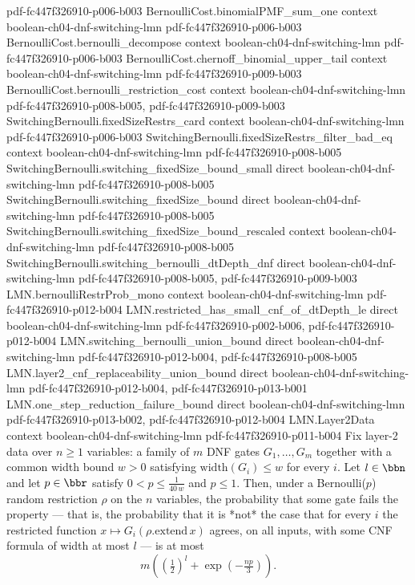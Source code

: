 \begin{theorem}
  {pdf-fc447f326910-p006-b003}
\proofstep
  {BernoulliCost.binomialPMF_sum_one}
  {context}
  {boolean-ch04-dnf-switching-lmn}
  {pdf-fc447f326910-p006-b003}
\proofstep
  {BernoulliCost.bernoulli_decompose}
  {context}
  {boolean-ch04-dnf-switching-lmn}
  {pdf-fc447f326910-p006-b003}
\proofstep
  {BernoulliCost.chernoff_binomial_upper_tail}
  {context}
  {boolean-ch04-dnf-switching-lmn}
  {pdf-fc447f326910-p009-b003}
\proofstep
  {BernoulliCost.bernoulli_restriction_cost}
  {context}
  {boolean-ch04-dnf-switching-lmn}
  {pdf-fc447f326910-p008-b005,
    pdf-fc447f326910-p009-b003}
\proofstep
  {SwitchingBernoulli.fixedSizeRestrs_card}
  {context}
  {boolean-ch04-dnf-switching-lmn}
  {pdf-fc447f326910-p006-b003}
\proofstep
  {SwitchingBernoulli.fixedSizeRestrs_filter_bad_eq}
  {context}
  {boolean-ch04-dnf-switching-lmn}
  {pdf-fc447f326910-p008-b005}
\proofstep
  {SwitchingBernoulli.switching_fixedSize_bound_small}
  {direct}
  {boolean-ch04-dnf-switching-lmn}
  {pdf-fc447f326910-p008-b005}
\proofstep
  {SwitchingBernoulli.switching_fixedSize_bound}
  {direct}
  {boolean-ch04-dnf-switching-lmn}
  {pdf-fc447f326910-p008-b005}
\proofstep
  {SwitchingBernoulli.switching_fixedSize_bound_rescaled}
  {context}
  {boolean-ch04-dnf-switching-lmn}
  {pdf-fc447f326910-p008-b005}
\proofstep
  {SwitchingBernoulli.switching_bernoulli_dtDepth_dnf}
  {direct}
  {boolean-ch04-dnf-switching-lmn}
  {pdf-fc447f326910-p008-b005,
    pdf-fc447f326910-p009-b003}
\proofstep
  {LMN.bernoulliRestrProb_mono}
  {context}
  {boolean-ch04-dnf-switching-lmn}
  {pdf-fc447f326910-p012-b004}
\proofstep
  {LMN.restricted_has_small_cnf_of_dtDepth_le}
  {direct}
  {boolean-ch04-dnf-switching-lmn}
  {pdf-fc447f326910-p002-b006,
    pdf-fc447f326910-p012-b004}
\proofstep
  {LMN.switching_bernoulli_union_bound}
  {direct}
  {boolean-ch04-dnf-switching-lmn}
  {pdf-fc447f326910-p012-b004,
    pdf-fc447f326910-p008-b005}
\proofstep
  {LMN.layer2_cnf_replaceability_union_bound}
  {direct}
  {boolean-ch04-dnf-switching-lmn}
  {pdf-fc447f326910-p012-b004,
    pdf-fc447f326910-p013-b001}
\proofstep
  {LMN.one_step_reduction_failure_bound}
  {direct}
  {boolean-ch04-dnf-switching-lmn}
  {pdf-fc447f326910-p013-b002,
    pdf-fc447f326910-p012-b004}
\proofstep
  {LMN.Layer2Data}
  {context}
  {boolean-ch04-dnf-switching-lmn}
  {pdf-fc447f326910-p011-b004}
Fix layer-2 data over $n \ge 1$ variables: a family of $m$ DNF gates $G_1, \dots, G_m$
together with a common width bound $w > 0$ satisfying $\mathrm{width}(G_i) \le w$ for
every $i$. Let $l \in \bbn$ and let $p \in \bbr$ satisfy $0 < p \le \tfrac{1}{40\,w}$
and $p \le 1$. Then, under a Bernoulli($p$) random restriction $\rho$ on the $n$
variables, the probability that some gate fails the property — that is, the probability
that it is *not* the case that for every $i$ the restricted function $x \mapsto
G_i(\rho.\mathrm{extend}\,x)$ agrees, on all inputs, with some CNF formula of width at
most $l$ — is at most
\[
  m\left(\left(\tfrac{1}{2}\right)^{l} + \exp\!\left(-\tfrac{n p}{3}\right)\right).
\]
\end{theorem}

